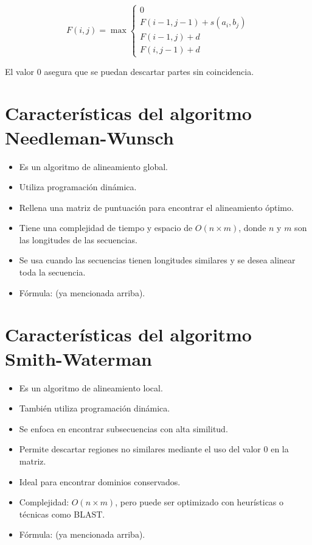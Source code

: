 \documentclass[fleqn,10pt]{article}
\begin{document}
\[
F(i,j) = \max \begin{cases}
0 \\
F(i-1, j-1) + s(a_i, b_j) \\
F(i-1, j) + d \\
F(i, j-1) + d
\end{cases}
\]

El valor $0$ asegura que se puedan descartar partes sin coincidencia.

\section{Características del algoritmo Needleman-Wunsch}
\begin{itemize}
    \item Es un algoritmo de alineamiento global.
    \item Utiliza programación dinámica.
    \item Rellena una matriz de puntuación para encontrar el alineamiento óptimo.
    \item Tiene una complejidad de tiempo y espacio de $O(n \times m)$, donde $n$ y $m$ son las longitudes de las secuencias.
    \item Se usa cuando las secuencias tienen longitudes similares y se desea alinear toda la secuencia.
    \item Fórmula: (ya mencionada arriba).
\end{itemize}

\section{Características del algoritmo Smith-Waterman}
\begin{itemize}
    \item Es un algoritmo de alineamiento local.
    \item También utiliza programación dinámica.
    \item Se enfoca en encontrar subsecuencias con alta similitud.
    \item Permite descartar regiones no similares mediante el uso del valor $0$ en la matriz.
    \item Ideal para encontrar dominios conservados.
    \item Complejidad: $O(n \times m)$, pero puede ser optimizado con heurísticas o técnicas como BLAST.
    \item Fórmula: (ya mencionada arriba).
\end{itemize}
\end{document}
